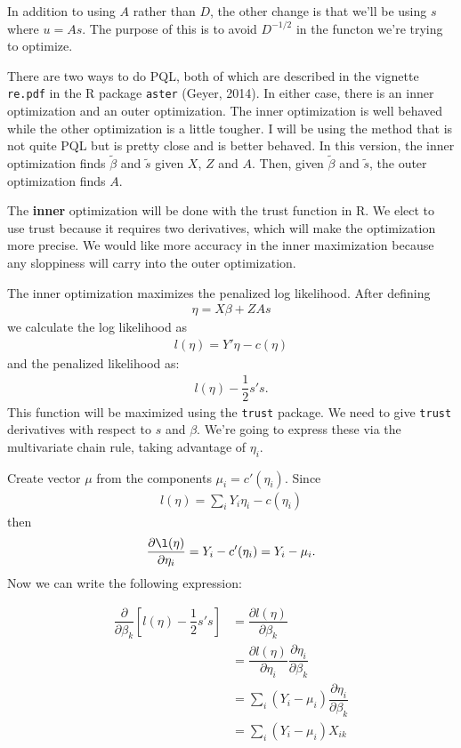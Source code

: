 \documentclass{article}
\begin{document}
In addition to using $A$ rather than $D$, the other change is that we'll be using $s$ where $u=As$. The purpose of this is to avoid $D^{-1/2}$ in the functon we're trying to optimize.


There are two ways to do PQL, both of which are described in the vignette
 \texttt{re.pdf} in the R package \texttt{aster} (Geyer, 2014). In either case, there is an inner optimization and an outer optimization. The inner optimization is well behaved while the other optimization is a little tougher. I will be using the method that is not quite PQL but is pretty close and is better behaved.  In this version, the inner optimization finds $\tilde{\beta}$ and $\tilde{s}$ given $X$, $Z$ and $A$. Then, given $\tilde{\beta}$ and $\tilde{s}$, the outer optimization finds $A$.




The {\bf inner} optimization will be done with the trust function in R. We elect to use trust because it requires two derivatives, which will make the optimization more precise. We would like more accuracy in the inner maximization because any sloppiness will carry into the outer optimization.

The inner optimization maximizes the penalized log likelihood. After defining
\begin{align}
\eta=X\beta +ZAs
\end{align}
we calculate the  log likelihood as 
\begin{align}
l(\eta)= Y' \eta - c(\eta) 
\end{align}
and the penalized likelihood as:
\begin{align}
 l(\eta)- \dfrac{1}{2} s's.
\end{align}
This function will be maximized using the \texttt{trust} package. We need to give \texttt{trust} derivatives with respect to $s$ and $\beta$. We're going to express these via the multivariate chain rule, taking advantage of $\eta_i$.

Create  vector $\mu$ from the components $\mu_i=c'(\eta_i)$.  Since
\begin{align}
l(\eta) = \sum_i Y_i \eta_i - c(\eta_i)
\end{align}
then 
\begin{align}
\dfrac{\partial \l(\eta)}{\partial \eta_i} = Y_i-c'(\eta_i) = Y_i -\mu_i.
\end{align}
 Now we can write the following expression:

\begin{align}
\dfrac{\partial}{\partial \beta_k} \left[ l(\eta)-\dfrac{1}{2} s's  \right] &= \dfrac{\partial l(\eta)}{\partial \beta_k}    \\
&= \dfrac{\partial l(\eta)}{\partial \eta_i} \dfrac{\partial \eta_i}{\partial \beta_k}    \\
&=\sum_i (Y_i-\mu_i) \dfrac{\partial \eta_i}{\partial \beta_k} \\
&=\sum_i (Y_i-\mu_i) X_{ik}
\end{align}
\end{document}
